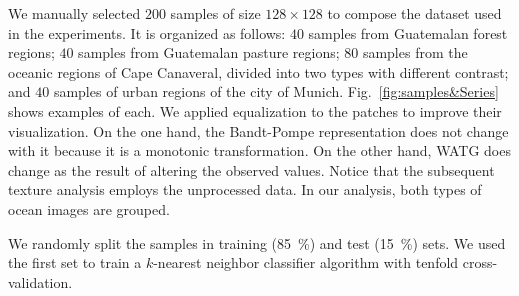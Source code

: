 \documentclass[journal]{IEEEtran}
\begin{document}
We manually selected $200$ samples of size $128 \times 128$ to compose the dataset used in the experiments.
It is organized as follows:
$40$ samples from Guatemalan forest regions;
$40$ samples from Guatemalan pasture regions;
$80$ samples from the oceanic regions of Cape Canaveral, divided into two types with different contrast; and
$40$ samples of urban regions of the city of Munich.
Fig.~\ref{fig:samples&Series} shows examples of each.
We applied equalization to the patches to improve their visualization.
On the one hand, the Bandt-Pompe representation does not change with it because it is a monotonic transformation.
On the other hand, WATG does change as the result of altering the observed values.
Notice that the subsequent texture analysis employs the unprocessed data.
In our analysis, both types of ocean images are grouped.

We randomly split the samples in training (\SI{85}{\percent}) and test (\SI{15}{\percent}) sets.
We used the first set to train a $k$-nearest neighbor classifier algorithm with tenfold
cross-validation.
\end{document}
